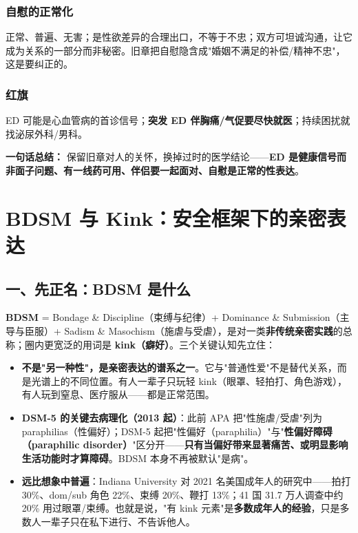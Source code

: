 \documentclass[12pt,UTF8,openany]{ctexbook}
\begin{document}
\subsection*{自慰的正常化}
正常、普遍、无害；是性欲差异的合理出口，不等于不忠；双方可坦诚沟通，让它成为关系的一部分而非秘密。旧章把自慰隐含成"婚姻不满足的补偿/精神不忠"，这是要纠正的。

\subsection*{红旗}
ED 可能是心血管病的首诊信号；\textbf{突发 ED 伴胸痛/气促要尽快就医}；持续困扰就找泌尿外科/男科。

\vspace{1em}
\noindent\textbf{一句话总结：} 保留旧章对人的关怀，换掉过时的医学结论——\textbf{ED 是健康信号而非面子问题、有一线药可用、伴侣要一起面对、自慰是正常的性表达}。

\chapter{BDSM 与 Kink：安全框架下的亲密表达}
\label{chap:bdsm}

\section{一、先正名：BDSM 是什么}

\textbf{BDSM} = Bondage \& Discipline（束缚与纪律）+ Dominance \& Submission（主导与臣服）+ Sadism \& Masochism（施虐与受虐），是对一类\textbf{非传统亲密实践}的总称；圈内更宽泛的用词是 \textbf{kink（癖好）}。三个关键认知先立住：

\begin{itemize}
  \item \textbf{不是"另一种性"，是亲密表达的谱系之一}。它与"普通性爱"不是替代关系，而是光谱上的不同位置。有人一辈子只玩轻 kink（眼罩、轻拍打、角色游戏），有人玩到窒息、医疗服从——都是正常范围。
  \item \textbf{DSM-5 的关键去病理化（2013 起）}：此前 APA 把"性施虐/受虐"列为 paraphilias（性偏好）；DSM-5 起把"性偏好（paraphilia）"与"\textbf{性偏好障碍（paraphilic disorder）}"区分开——\textbf{只有当偏好带来显著痛苦、或明显影响生活功能时才算障碍}。BDSM 本身不再被默认"是病"。
  \item \textbf{远比想象中普遍}：Indiana University 对 2021 名美国成年人的研究中——拍打 30\%、dom/sub 角色 22\%、束缚 20\%、鞭打 13\%；41 国 31.7 万人调查中约 20\% 用过眼罩/束缚。也就是说，"有 kink 元素"是\textbf{多数成年人的经验}，只是多数人一辈子只在私下进行、不告诉他人。
\end{itemize}
\end{document}
